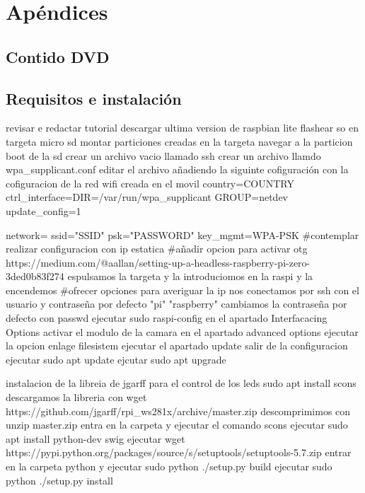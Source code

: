 \newpage
\chapter*{Apéndices}
\thispagestyle{empty}

\section{Contido DVD}

\section{Requisitos e instalación}
revisar e redactar tutorial
descargar ultima version de raspbian lite
flashear so en targeta micro sd
montar particiones creadas en la targeta
navegar a la particion boot de la sd
crear un archivo vacio llamado ssh
crear un archivo llamdo wpa_supplicant.conf
editar el archivo añadiendo la siguinte cofiguración con la cofiguracion de la red wifi creada en el movil
	country=COUNTRY
	ctrl_interface=DIR=/var/run/wpa_supplicant GROUP=netdev
	update_config=1

	network={
	       ssid="SSID"
	       psk="PASSWORD"
	       key_mgmt=WPA-PSK
	    }
#contemplar realizar configuracion con ip estatica
#añadir opcion para activar otg https://medium.com/@aallan/setting-up-a-headless-raspberry-pi-zero-3ded0b83f274
espulsamos la targeta y la introduciomos en la raspi y la encendemos
#ofrecer opciones para averiguar la ip
nos conectamos por ssh con el usuario y contraseña por defecto "pi" "raspberry"
cambiamos la contraseña por defecto con passwd
ejecutar sudo raspi-config
en el apartado Interfacacing Options activar el modulo de la camara
en el apartado advanced options ejecutar la opcion enlage filesistem
ejecutar el apartado update
salir de la configuracion
ejecutar sudo apt update
ejcutar sudo apt upgrade

instalacion de la libreia de jgarff para el control de los leds
sudo apt install scons
descargamos la libreria con wget https://github.com/jgarff/rpi_ws281x/archive/master.zip
descomprimimos con unzip master.zip
entra en la carpeta y ejecutar el comando scons
ejecutar sudo apt install python-dev swig
ejecutar wget https://pypi.python.org/packages/source/s/setuptools/setuptools-5.7.zip
entrar en la carpeta python y ejecutar sudo python ./setup.py build
ejecutar sudo python ./setup.py install

\newpage
\thispagestyle{empty}
